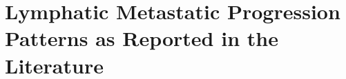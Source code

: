 \documentclass[\relativeRoot/main.tex]{subfiles}
\begin{document}
\section{Lymphatic Metastatic Progression Patterns as Reported in the Literature}
\label{sec:previous_work:sanguineti}
\end{document}
